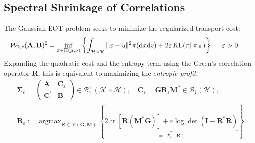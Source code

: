 \documentclass[noinfoline]{imsart}\setcounter{tocdepth}{2}
\newcommand{\m}[1]{\mathbf{#1}}
\renewcommand{\c}[1]{\mathcal{#1}}
\newcommand{\rd}{\mathrm{d}}
\newcommand{\indep}{\perp\mkern-9.5mu\perp}
\DeclareMathOperator*{\argmax}{\arg\max}
\DeclareMathOperator{\tr}{tr}
\DeclareMathOperator{\KL}{KL}
\theoremstyle{plain}
\begin{document}
\subsection{Spectral Shrinkage of Correlations}

The Gaussian EOT problem seeks to minimize the regularized transport cost:
\begin{align*}
    \c{W}_{2, \varepsilon} (\m{A}, \m{B})^{2} &= \inf_{\pi \in \Pi(\mu, \nu)} \left\{ \int_{\c{H} \times \c{H}} \|x-y\|^{2} \pi(\rd x \rd y) + 2 \varepsilon \KL(\pi \| \pi_{\indep}) \right\}, \quad \varepsilon > 0.
\end{align*}
Expanding the quadratic cost and the entropy term using the Green's correlation operator $\m{R}$, this is equivalent to maximizing the \emph{entropic profit}:
\begin{align}
    &\m{\Sigma}_{\varepsilon} = 
    \left(
    \begin{array}{c|c}
    \m{A} & \m{C}_{\varepsilon} \\
    \hline
    \m{C}_{\varepsilon}^{*} & \m{B}
    \end{array}
    \right) \in \c{B}_{1}^{+}(\c{H} \times \c{H}), \quad \m{C}_{\varepsilon} = \m{G} \m{R}_{\varepsilon} \m{M}^* \in \c{B}_{1}(\c{H}), \label{eq:opt:cross-cov} \\
    &\m{R}_{\varepsilon} := \argmax_{\m{R} \in \c{F}(\m{G}, \m{M})} \left\{ \underbrace{2 \tr [\m{R} (\m{M}^{*} \m{G})] + \varepsilon \log \det(\m{I} - \m{R}^* \m{R})}_{=:\c{P}_{\varepsilon}(\m{R})} \right\}. \label{eq:opt:corr}
\end{align}
\end{document}
